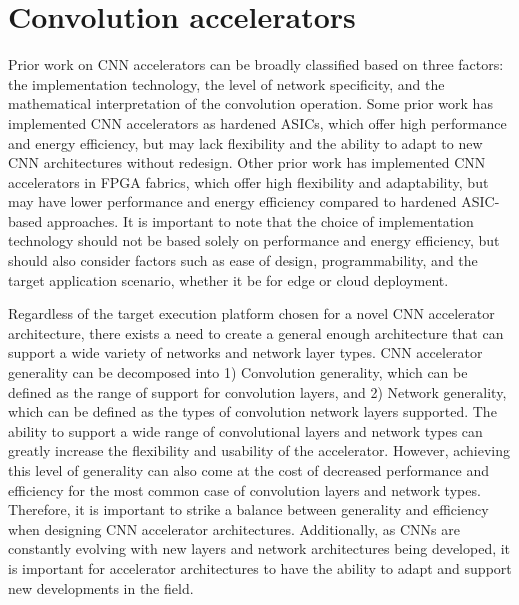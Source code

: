 \section{Convolution accelerators}
\label{chap:intro:cnn_accelerator_design_approaches}

Prior work on CNN accelerators can be broadly classified based on three factors:
the implementation technology, the level of network specificity, and the
mathematical interpretation of the convolution operation. Some prior work has
implemented CNN accelerators as hardened ASICs, which offer high performance and
energy efficiency, but may lack flexibility and the ability to adapt to new CNN
architectures without redesign. Other prior work has implemented CNN
accelerators in FPGA fabrics, which offer high flexibility and adaptability, but
may have lower performance and energy efficiency compared to hardened ASIC-based
approaches. It is important to note that the choice of implementation technology
should not be based solely on performance and energy efficiency, but should also
consider factors such as ease of design, programmability, and the target
application scenario, whether it be for edge or cloud deployment.

Regardless of the target execution platform chosen for a novel CNN accelerator
architecture, there exists a need to create a general enough architecture that
can support a wide variety of networks and network layer types. CNN accelerator
generality can be decomposed into 1) Convolution generality, which can be
defined as the range of support for convolution layers, and 2) Network
generality, which can be defined as the types of convolution network layers
supported. The ability to support a wide range of convolutional layers and
network types can greatly increase the flexibility and usability of the
accelerator. However, achieving this level of generality can also come at the
cost of decreased performance and efficiency for the most common case of
convolution layers and network types. Therefore, it is important to strike a
balance between generality and efficiency when designing CNN accelerator
architectures. Additionally, as CNNs are constantly evolving with new layers and
network architectures being developed, it is important for accelerator
architectures to have the ability to adapt and support new developments in the
field.

